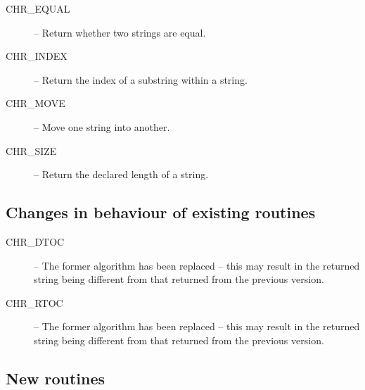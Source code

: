 \begin{description}
\item [CHR\_EQUAL] -- Return whether two strings are equal.
\item [CHR\_INDEX] -- Return the index of a substring within a string.
\item [CHR\_MOVE] -- Move one string into another.
\item [CHR\_SIZE] -- Return the declared length of a string.
\end {description}


\subsection {Changes in behaviour of existing routines}

\begin{description}
\item [CHR\_DTOC] -- The former algorithm has been replaced -- this may result
in the returned string being different from that returned from the previous
version.
\item [CHR\_RTOC] -- The former algorithm has been replaced -- this may result
in the returned string being different from that returned from the previous
version.
\end {description}


\subsection {New routines}

